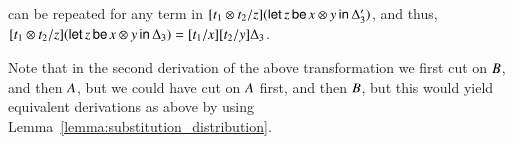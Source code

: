\begin{report}
\begin{itemize}
can be repeated for any term in $[   \mathit{t_{{\mathrm{1}}}}  \otimes  \mathit{t_{{\mathrm{2}}}}   /  \mathit{z}  ]  (    \mathsf{let}\, \mathit{z} \,\mathsf{be}\,  \mathit{x}  \otimes  \mathit{y}  \,\mathsf{in}\, \Delta'_{{\mathrm{3}}}    )$, and thus, $[   \mathit{t_{{\mathrm{1}}}}  \otimes  \mathit{t_{{\mathrm{2}}}}   /  \mathit{z}  ]  (    \mathsf{let}\, \mathit{z} \,\mathsf{be}\,  \mathit{x}  \otimes  \mathit{y}  \,\mathsf{in}\, \Delta_{{\mathrm{3}}}    )  =  [  \mathit{t_{{\mathrm{1}}}}  /  \mathit{x}  ]  [  \mathit{t_{{\mathrm{2}}}}  /  \mathit{y}  ]  \Delta_{{\mathrm{3}}}$.

Note that in the second derivation of the above transformation we
first cut on $\mathit{B}$, and then $\mathit{A}$, but we could have cut on
$\mathit{A}$ first, and then $\mathit{B}$, but this would yield equivalent
derivations as above by using
Lemma~\ref{lemma:substitution_distribution}.


\end{itemize}
\end{report}
